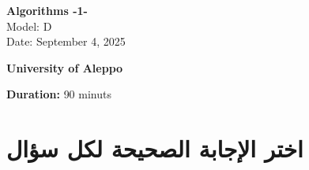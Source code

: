 \documentclass[12pt]{article}
\begin{document}
\begin{flushright}
{\Large \textbf{{\textenglish{Algorithms -1-}}}}\\[0.25em]
{\normalsize \textenglish{Model: }{\textenglish{D}}}\\[0.1em]
{\normalsize \textenglish{Date: }{\textenglish{September 4, 2025}}}
\end{flushright}

\vspace{0.6cm}

\noindent
\begin{minipage}[t]{0.65\textwidth}
  \raggedright
  \textbf{{\textenglish{University of Aleppo}}}\\[0.3em]
\end{minipage}\hfill
\begin{minipage}[t]{0.3\textwidth}
  \raggedleft
  \textenglish{\textbf{Duration: }}{\textenglish{90 minuts}}
\end{minipage}

\vspace{0.9cm}

\section*{اختر الإجابة الصحيحة لكل سؤال}
\end{document}
